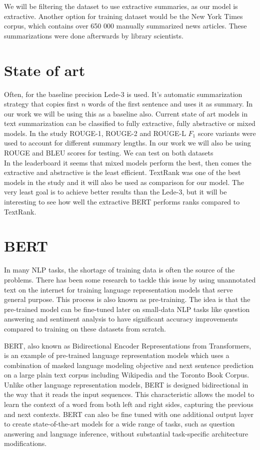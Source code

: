 \documentclass{article}
\begin{document}
\noindent
We will be filtering the dataset \cite{dataset} to use extractive summaries, as our model is extractive. Another option for training dataset would be the New York Times corpus, which contains over 650 000 manually summarized news articles. These summarizations were done afterwards by library scientists. \cite{ny_dataset} 


\section{State of art }

Often, for the baseline precision Lede-3 is used. It's automatic summarization strategy that copies first $n$ words of the first sentence and uses it as summary. In our work we will be using this as a baseline also. Current state of art models in text summarization can be classified to fully extractive, fully abstractive or mixed models. In the study \cite{dataset} ROUGE-1, ROUGE-2 and ROUGE-L $F_1$ score variants were used to account for different summary lengths. In our work we will also be using ROUGE and BLEU scores for testing. We can test on both datasets \cite{dataset} \cite{ny_dataset}\\

\noindent
In the leaderboard it seems that mixed models perform the best, then comes the extractive and abstractive is the least efficient. TextRank was one of the best models in the study \cite{dataset} and it will also be used as comparison for our model.
The very least goal is to achieve better results than the Lede-3, but it will be interesting to see how well the extractive BERT performs ranks compared to TextRank. 

\section{BERT }
In many NLP tasks, the shortage of training data is often the source of the problems. There has been some research to tackle this issue by using unannotated text on the internet for training language representation models that serve general purpose. This process is also known as pre-training. The idea is that the pre-trained model can be fine-tuned later on small-data NLP tasks like question answering and sentiment analysis to have significant accuracy improvements compared to training on these datasets from scratch. 

BERT, also known as Bidirectional Encoder Representations from Transformers, is an example of pre-trained language representation models which uses a combination of masked language modeling objective and next sentence prediction on a large plain text corpus including Wikipedia and the Toronto Book Corpus. Unlike other language representation models, BERT is designed bidirectional in the way that it reads the input sequences. This characteristic allows the model to learn the context of a word from both left and right sides, capturing the previous and next contexts. BERT can also be fine tuned with one additional output layer to create state-of-the-art models for a wide range of tasks, such as question answering and language inference, without substantial task-specific architecture modifications. \cite{devlin2019bert}
\end{document}
